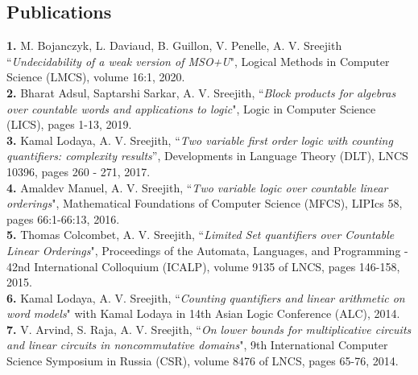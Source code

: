 \documentclass[margin]{res}
\begin{document}
\begin{resume}
 
\section{Publications}
{\bf 1.} M. Bojanczyk, L. Daviaud, B. Guillon, V. Penelle, A. V. Sreejith ``\emph{Undecidability of a weak version of MSO+U}", Logical Methods in Computer Science (LMCS), volume 16:1, 2020. \\
{\bf 2.} Bharat Adsul, Saptarshi Sarkar, A. V. Sreejith, ``\emph{Block products for algebras over countable words and applications to logic}", Logic in Computer Science (LICS), pages 1-13, 2019. \\
{\bf 3.} Kamal Lodaya, A. V. Sreejith, ``\emph{Two variable first order logic with counting quantifiers: complexity results}'', Developments in Language Theory (DLT), LNCS 10396, pages 260 - 271, 2017. \\
{\bf 4.} Amaldev Manuel, A. V. Sreejith, ``\emph{Two variable logic over countable linear orderings}", Mathematical Foundations of Computer Science (MFCS), LIPIcs 58, pages 66:1-66:13, 2016. \\
{\bf 5.} Thomas Colcombet, A. V. Sreejith, ``\emph{Limited Set quantifiers over Countable Linear Orderings}", Proceedings of the Automata, Languages, and Programming - 42nd International Colloquium (ICALP), volume 9135 of LNCS, pages 146-158, 2015. \\
{\bf 6.} Kamal Lodaya, A. V. Sreejith, ``\emph{Counting quantifiers and linear arithmetic on word models}" with Kamal Lodaya in 14th Asian Logic Conference (ALC), 2014. \\
{\bf 7.} V. Arvind, S. Raja, A. V. Sreejith, ``\emph{On lower bounds for multiplicative circuits and linear circuits in noncommutative domains}", 9th International Computer Science Symposium in Russia (CSR), volume 8476 of LNCS, pages 65-76, 2014.\\



\end{resume}
\end{document}

